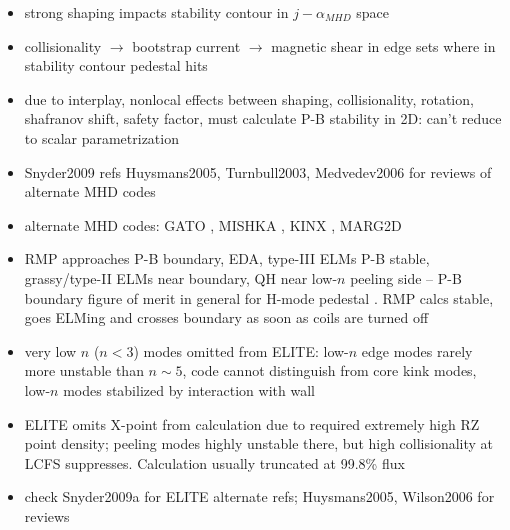 \begin{itemize}
 \item strong shaping impacts stability contour in $j-\alpha_{MHD}$ space \cite{Snyder2009}
 \item collisionality $\rightarrow$ bootstrap current $\rightarrow$ magnetic shear in edge sets where in stability contour pedestal hits \cite{Snyder2009}
 \item due to interplay, nonlocal effects between shaping, collisionality, rotation, shafranov shift, safety factor, must calculate P-B stability in 2D: can't reduce to scalar parametrization \cite{Snyder2009}
 \item Snyder2009 refs Huysmans2005, Turnbull2003, Medvedev2006 \cite{Huysmans2005,Turnbull2003,Medvedev2006} for reviews of alternate MHD codes
 \item alternate MHD codes: GATO \cite{Bernard1981}, MISHKA \cite{Huysmans2001,Mikhailovskii1997}, KINX \cite{Degtyarev1997,Medvedev2006}, MARG2D \cite{Aiba2006,Aiba2007}
 \item RMP approaches P-B boundary, EDA, type-III ELMs P-B stable, grassy/type-II ELMs near boundary, QH near low-$n$ peeling side -- P-B boundary figure of merit in general for H-mode pedestal \cite{Snyder2009}.  RMP calcs stable, goes ELMing and crosses boundary as soon as coils are turned off \cite{Snyder2009a}
 \item very low $n$ ($n < 3$) modes omitted from ELITE: low-$n$ edge modes rarely more unstable than $n \sim 5$, code cannot distinguish from core kink modes, low-$n$ modes stabilized by interaction with wall \cite{Snyder2009}
 \item ELITE omits X-point from calculation due to required extremely high RZ point density; peeling modes highly unstable there, but high collisionality at LCFS suppresses.  Calculation usually truncated at 99.8\% flux \cite{Snyder2009a}
 \item check Snyder2009a for ELITE alternate refs; Huysmans2005, Wilson2006 for reviews \cite{Snyder2009a,Huysmans2005,Wilson2006}
\end{itemize}

\begin{figure}
 \pushtooutside
\end{figure}

